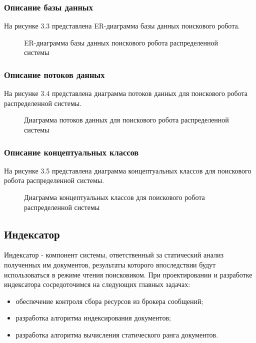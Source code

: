 \subsubsection{Описание базы данных}

На рисунке 3.3 представлена ER-диаграмма базы данных поискового робота.

\begin{figure}
\caption{ER-диаграмма базы данных поискового робота распределенной системы}
\label{robot/robot_db:image}
\end{figure}

\subsubsection{Описание потоков данных}

На рисунке 3.4 представлена диаграмма потоков данных для поискового робота распределенной системы.

\begin{figure}
\caption{Диаграмма потоков данных для поискового робота распределенной системы}
\label{robot/diagram_dataflow:image}
\end{figure}

\subsubsection{Описание концептуальных классов}

На рисунке 3.5 представлена диаграмма концептуальных классов для поискового робота распределенной системы.

\begin{figure}
\caption{Диаграмма концептуальных классов для поискового робота распределенной системы}
\label{robot/diagram_classes:image}
\end{figure}

\subsection{Индексатор}

Индексатор - компонент системы, ответственный за статический анализ полученных им документов, результаты которого впоследствии будут использоваться в режиме чтения поисковиком. 
При проектировании и разработке индексатора сосредоточимся на следующих главных задачах:
\begin{itemize}
\item обеспечение контроля сбора ресурсов из брокера сообщений;
\item разработка алгоритма индексирования документов;
\item разработка алгоритма вычисления статического ранга документов.
\end{itemize}

